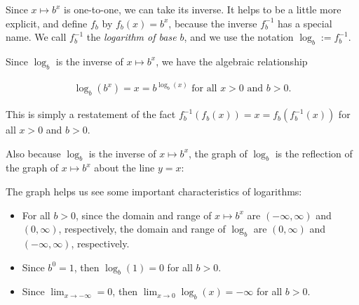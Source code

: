 Since $x \mapsto b^x$ is one-to-one, we can take its inverse. It helps to be a little more explicit, and define $f_b$ by $f_b(x) = b^x$, because the inverse $f_b^{-1}$ has a special name. We call $f_b^{-1}$ the \textit{logarithm of base $b$}, and we use the notation $\log_b := f_b^{-1}$.

Since $\log_b$ is the inverse of $x \mapsto b^x$, we have the algebraic relationship

\begin{align*}
    \log_b(b^x) = x = b^{\log_b(x)} \text{ for all $x > 0$ and $b > 0$}.
\end{align*}

This is simply a restatement of the fact $f_b^{-1}(f_b(x)) = x = f_b(f_b^{-1}(x))$ for all $x > 0$ and $b > 0$.

Also because $\log_b$ is the inverse of $x \mapsto b^x$, the graph of $\log_b$ is the reflection of the graph of $x \mapsto b^x$ about the line $y = x$:

\begin{center}
\end{center}

The graph helps us see some important characteristics of logarithms:

\begin{itemize}
    \item For all $b > 0$, since the domain and range of $x \mapsto b^x$ are $(-\infty, \infty)$ and $(0, \infty)$, respectively, the domain and range of $\log_b$ are $(0, \infty)$ and $(-\infty, \infty)$, respectively. 
    \item Since $b^0 = 1$, then $\log_b(1) = 0$ for all $b > 0$.
    \item Since $\lim_{x \rightarrow -\infty} = 0$, then $\lim_{x \rightarrow 0} \log_b(x) = -\infty$ for all $b > 0$.
\end{itemize}




